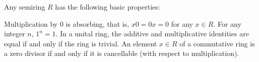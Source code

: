 \begin{proposition}\label{thm:semiring_properties}
  Any semiring \( R \) has the following basic properties:
  \begin{propenum}
     Multiplication by \( 0 \) is absorbing, that is, \( x0 = 0x = 0 \) for any \( x \in R \).
     For any integer \( n \), \( 1^n = 1 \).
     In a unital ring, the additive and multiplicative identities are equal if and only if the ring is trivial.
     An element \( x \in R \) of a commutative ring is a zero divisor if and only if it is cancellable (with respect to multiplication).
  \end{propenum}
\end{proposition}
